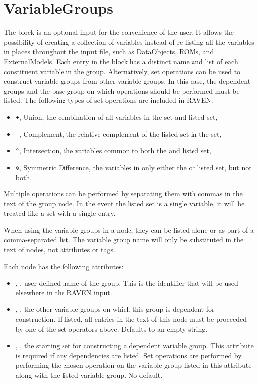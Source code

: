 \section{VariableGroups}
\label{sec:VariableGroups}

The  block is an optional input for the convenience of the user.  It allows the
possibility of creating a collection of variables instead of re-listing all the variables in places throughout
the input file, such as DataObjects, ROMs, and ExternalModels.
%
Each entry in the  block has a distinct name and list of each constituent variable in
the group.
%
Alternatively, set operations can be used to construct variable groups from other variable groups.  In this case,
the dependent groups and the base group on which operations should be performed must be listed.  The following types of
set operations are included in RAVEN:
\begin{itemize}
  \item \texttt{+}, Union, the combination of all variables in the  set and listed set,
  \item \texttt{-}, Complement, the relative complement of the listed set in the  set,
  \item \texttt{\^}, Intersection, the variables common to both the  and listed set,
  \item \texttt{\%}, Symmetric Difference, the variables in only either the  or listed set,
    but not both.
\end{itemize}
Multiple operations can be performed by separating them with commas in the text of the group node.  In the
event the listed set is a single variable, it will be treated like a set with a single entry.

When using the variable groups in a node, they can be listed alone or as part of a comma-separated list.  The
variable group name will only be substituted in the text of nodes, not attributes or tags.

Each  node has the following attributes:
\vspace{-5mm}
\begin{itemize}
  \itemsep0em
  \item {}, , user-defined name
  of the group. This is the identifier that will be used elsewhere in the RAVEN input.
  \item {}, , the other variable groups
    on which this group is dependent for construction.  If listed, all entries in the text of this node must
    be proceeded by one of the set operators above.  Defaults to an empty string.
  \item {}, , the starting set for constructing a dependent
    variable group.  This attribute is required if any dependencies are listed.  Set operations are performed
    by performing the chosen operation on the variable group listed in this attribute along with the listed
    variable group.  No default.
\end{itemize}
\vspace{-5mm}

